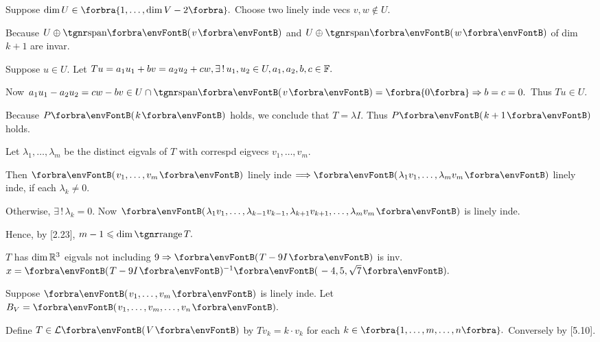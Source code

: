 \documentclass[a4paper, 11pt, UTF8]{article}
\begin{document}
\begin{large}
Suppose $\dim U\in\Bra{1,\dots,\dim V-2}.$ Choose two linely inde vecs $v,w\not\in U.$\par\quad\Hii
Because $U\oplus\Span{v}$ and $U\oplus\Span{w}$ of dim $k+1$ are invar.\par\quad\Hii
Suppose $u\in U.$ Let $Tu=a_1u_1+bv=a_2u_2+cw,\exists\,!\,u_1,u_2\in U,a_1,a_2,b,c\in{\mathbb{F}}.$\par\quad\Hii
Now $a_1u_1-a_2u_2=cw-bv\in U\cap\Span{v}=\zeroSubs\Rightarrow b=c=0.$ Thus $Tu\in U.$\par\quad\Hii
Because $P\Par{k}$ holds, we conclude that $T=\lambda I.$ Thus $P\Par{k+1}$ holds.\PfEnd
\SepLine

\par\quad
Let $\lambda_1,\dots,\lambda_m$ be the distinct eigvals of $T$ with correspd eigvecs $v_1,\dots,v_m.$\par\quad%
\par\quad
Then $\Par{v_1,\dots,v_m}$ linely inde $\Longrightarrow\Par{\lambda_1 v_1,\dots,\lambda_m v_m}$ linely inde, if each $\lambda_k\neq 0.$\par\quad
Otherwise, $\exists\,!\,\lambda_k=0.$ Now $\Par{\lambda_1v_1,\dots,\lambda_{k-1}v_{k-1},\lambda_{k+1}v_{k+1},\dots,\lambda_mv_m}$ is linely inde.\par\quad
Hence, by [2.23], $m-1\leqslant\dim\range T.$\PfEnd
\SepLine

$T$ has $\dim{\mathbb{R}}^3$ eigvals not including $9\Rightarrow\Par{T-9I}$ is inv. $x=\Par{T-9I}{^{-1}}\Par{-4,5,\sqrt{7}}.$\PfEnd
\SepLine

Suppose $\Par{v_1,\dots,v_m}$ is linely inde. Let $B_V=\Par{v_1,\dots,v_m,\dots,v_n}.$\par
\Blind{\Solution} Define $T\in\Lm{V}$ by $Tv_k=k\cdot v_k$ for each $k\in\Bra{1,\dots,m,\dots,n}.$ Conversely by [5.10].\PfEnd\vspace{-4pt}
\SepLine


\end{large}
\end{document}
